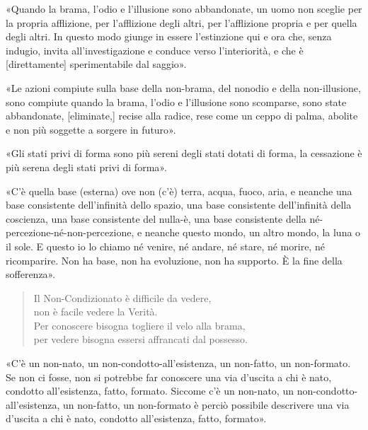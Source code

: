 
«Quando la brama, l’odio e l’illusione sono abbandonate, un uomo non sceglie per
la propria afflizione, per l’afflizione degli altri, per l’afflizione propria e
per quella degli altri. In questo modo giunge in essere l’estinzione qui e ora
che, senza indugio, invita all’investigazione e conduce verso l’interiorità, e
che è [direttamente] sperimentabile dal saggio».


«Le azioni compiute sulla base della non-brama, del nonodio e della
non-illusione, sono compiute quando la brama, l’odio e l’illusione sono
scomparse, sono state abbandonate, [eliminate,] recise alla radice, rese come un
ceppo di palma, abolite e non più soggette a sorgere in futuro».


«Gli stati privi di forma sono più sereni degli stati dotati di forma, la
cessazione è più serena degli stati privi di forma».


«C’è quella base (esterna) ove non (c’è) terra, acqua, fuoco, aria, e neanche
una base consistente dell’infinità dello spazio, una base consistente
dell’infinità della coscienza, una base consistente del nulla-è, una base
consistente della né-percezione-né-non-percezione, e neanche questo mondo, un
altro mondo, la luna o il sole. E questo io lo chiamo né venire, né andare, né
stare, né morire, né ricomparire. Non ha base, non ha evoluzione, non ha
supporto. È la fine della sofferenza».

\begin{quote}
Il Non-Condizionato è difficile da vedere, \\
non è facile vedere la Verità. \\
Per conoscere bisogna togliere il velo alla brama, \\
per vedere bisogna essersi affrancati dal possesso.
\end{quote}

«C’è un non-nato, un non-condotto-all’esistenza, un non-fatto, un non-formato.
Se non ci fosse, non si potrebbe far conoscere una via d’uscita a chi è nato,
condotto all’esistenza, fatto, formato. Siccome c’è un non-nato, un
non-condotto-all’esistenza, un non-fatto, un non-formato è perciò possibile
descrivere una via d’uscita a chi è nato, condotto all’esistenza, fatto,
formato».

